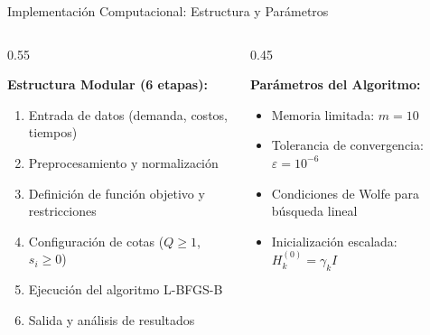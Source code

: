 \documentclass[
  ignorenonframetext,
]{beamer}
\begin{document}
\begin{frame}{Implementación Computacional: Estructura y Parámetros}
\label{implementaciuxf3n-computacional-estructura-y-paruxe1metros}
\begin{columns}[T]
\begin{column}{0.55\linewidth}
\justifying
{}

\textbf{Estructura Modular (6 etapas):}

\begin{enumerate}
\item Entrada de datos (demanda, costos, tiempos)
\item Preprocesamiento y normalización
\item Definición de función objetivo y restricciones
\item Configuración de cotas ($Q \geq 1$, $s_i \geq 0$)
\item Ejecución del algoritmo L-BFGS-B
\item Salida y análisis de resultados
\end{enumerate}
\end{column}

\begin{column}{0.45\linewidth}
\justifying
{}

\textbf{Parámetros del Algoritmo:}

\begin{itemize}
\item Memoria limitada: $m = 10$
\item Tolerancia de convergencia: $\varepsilon = 10^{-6}$
\item Condiciones de Wolfe para búsqueda lineal
\item Inicialización escalada: $H_k^{(0)} = \gamma_k I$
\end{itemize}
\end{column}
\end{columns}
\end{frame}
\end{document}
